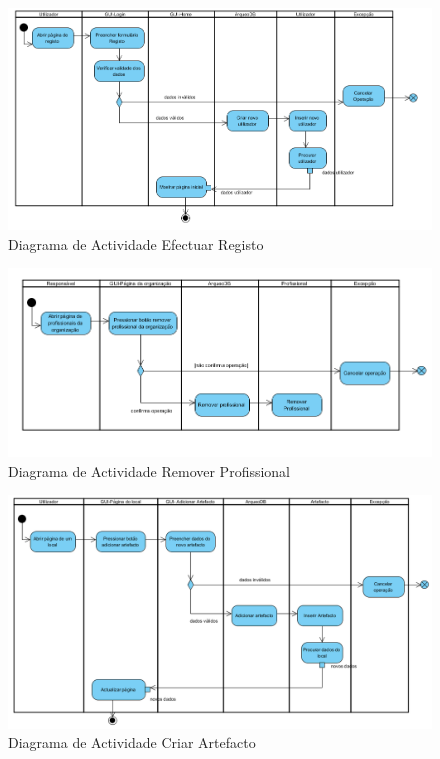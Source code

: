 ﻿\documentclass[12pt,a4paper]{article}
\begin{document}
\begin{figure}[h!]
\centering
\includegraphics[scale=0.7]{actividade/registo}
\caption{Diagrama de Actividade Efectuar Registo} 
\end{figure} 

\begin{figure}[h!]
\centering
\includegraphics[scale=0.7]{actividade/removerprofissional}
\caption{Diagrama de Actividade Remover Profissional} 
\end{figure} 

\begin{figure}[h!]
\centering
\includegraphics[scale=0.6]{actividade/criarartefacto}
\caption{Diagrama de Actividade Criar Artefacto} 
\end{figure} 
\end{document}
